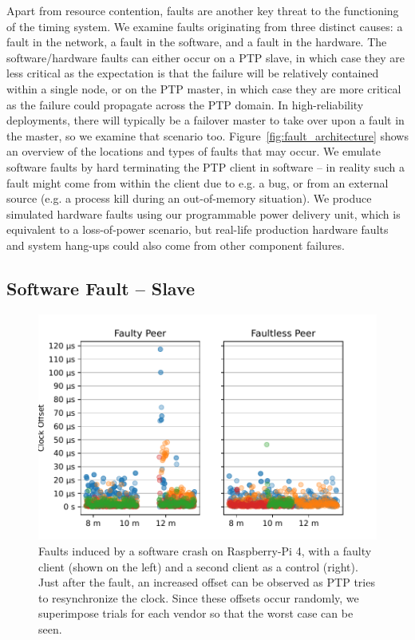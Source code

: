 Apart from resource contention, faults are another key threat to the functioning of the timing system. We examine faults originating from three distinct causes: a fault in the network, a fault in the software, and a fault in the hardware. The software/hardware faults can either occur on a PTP slave, in which case they are less critical as the expectation is that the failure will be relatively contained within a single node, or on the PTP master, in which case they are more critical as the failure could propagate across the PTP domain. In high-reliability deployments, there will typically be a failover master to take over upon a fault in the master, so we examine that scenario too. Figure~\ref{fig:fault_architecture} shows an overview of the locations and types of faults that may occur. We emulate software faults by hard terminating the PTP client in software -- in reality such a fault might come from within the client due to e.g. a bug, or from an external source (e.g. a process kill during an out-of-memory situation). We produce simulated hardware faults using our programmable power delivery unit, which is equivalent to a loss-of-power scenario, but real-life production hardware faults and system hang-ups could also come from other component failures.

\subsection{Software Fault -- Slave}

\xdef\bSoftwareFaultNumProfiles{\cmpMax}
\newcommand{\maxClockSlew}{(0.05/100)}
\newcommand{\windowOfUncertaintyOneMinute}{(60*(\maxClockSlew))}

\begin{figure}
    \includegraphics[width=\linewidth]{res/generated/fault/software/slave_rpi-4_peer_comparison.pdf}
    \caption{Faults induced by a software crash on Raspberry-Pi 4, with a faulty client (shown on the left) and a second client as a control (right). Just after the fault, an increased offset can be observed as PTP tries to resynchronize the clock. Since these offsets occur randomly, we superimpose \fNum{\bSoftwareFaultNumProfiles} trials for each vendor so that the worst case can be seen.}
    \label{fig:software_fault}
\end{figure}

